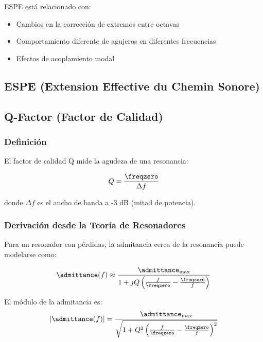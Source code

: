 ESPE está relacionado con:
\begin{itemize}
    \item Cambios en la corrección de extremos entre octavas
    \item Comportamiento diferente de agujeros en diferentes frecuencias
    \item Efectos de acoplamiento modal
\end{itemize}

\subsection{ESPE (Extension Effective du Chemin Sonore)}


\subsection{Q-Factor (Factor de Calidad)}

\subsubsection{Definición}

El factor de calidad Q mide la agudeza de una resonancia:

\begin{equation}
Q = \frac{\freqzero}{\Delta f}
\label{eq:q_factor}
\end{equation}

donde $\Delta f$ es el ancho de banda a -3 dB (mitad de potencia).

\subsubsection{Derivación desde la Teoría de Resonadores}

Para un resonador con pérdidas, la admitancia cerca de la resonancia puede modelarse como:

\begin{equation}
\admittance(f) \approx \frac{\admittance_{\max}}{1 + j Q \left(\frac{f}{\freqzero} - \frac{\freqzero}{f}\right)}
\end{equation}

El módulo de la admitancia es:
\begin{equation}
|\admittance(f)| = \frac{\admittance_{\max}}{\sqrt{1 + Q^2 \left(\frac{f}{\freqzero} - \frac{\freqzero}{f}\right)^2}}
\end{equation}

